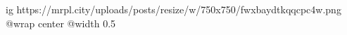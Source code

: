  
 
 
 
 

\ifcmt
  ig https://mrpl.city/uploads/posts/resize/w/750x750/fwxbaydtkqqcpc4w.png
  @wrap center
  @width 0.5
\fi
